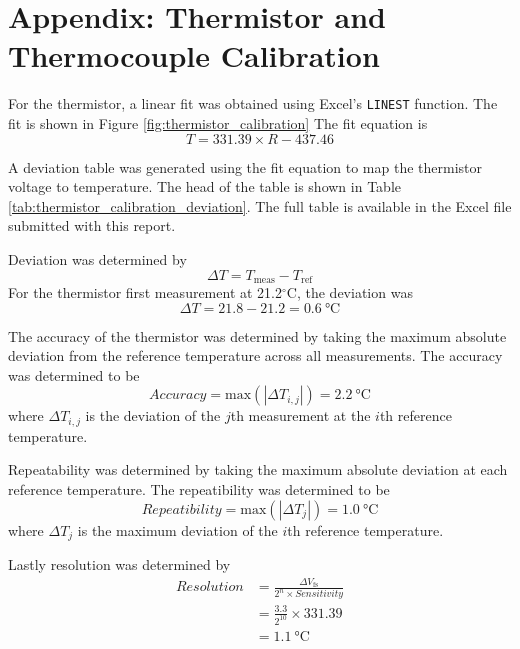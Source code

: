 \section{Appendix: Thermistor and Thermocouple Calibration}

\noindent For the thermistor, a linear fit was obtained using Excel's \texttt{LINEST} function. The fit is shown in Figure \ref{fig:thermistor_calibration}
The fit equation is 
\begin{equation}
    T = 331.39 \times R  -437.46 \label{eq:thermistor_calibration}
\end{equation}

A deviation table was generated using the fit equation to map the thermistor voltage to temperature. The head of the table is shown in 
Table \ref{tab:thermistor_calibration_deviation}. The full table is available in the Excel file submitted with this report.

Deviation was determined by 
\begin{equation}
    \Delta T  = T_{\text{meas}} - T_{\text{ref}} \nonumber
\end{equation}
For the thermistor first measurement at 21.2$^\circ$C, the deviation was
\begin{equation}
    \Delta T = 21.8 - 21.2 = \qty{0.6}{\celsius} \nonumber
\end{equation}


The accuracy of the thermistor was determined by taking the maximum absolute deviation from the reference temperature across all measurements. The 
accuracy was determined to be
\begin{equation}
    Accuracy = \text{max}(|\Delta T_{i, j}|) = \qty{2.2}{\celsius} \nonumber
\end{equation}
where $\Delta T_{i, j}$ is the deviation of the $j$th measurement at the $i$th reference temperature.

Repeatability was determined by taking the maximum absolute deviation at each reference temperature. The repeatibility was determined to be
\begin{equation}
    Repeatibility = \text{max}(|\Delta T_{j}|) = \qty{1.0}{\celsius} \nonumber
\end{equation}
where $\Delta T_{j}$ is the maximum deviation of the $i$th reference temperature.

Lastly resolution was determined by
\begin{align*}
    Resolution &= \frac{\Delta V_{\text{fs}}}{2^n \times Sensitivity} \\
               &= \frac{3.3}{2^{10}} \times 331.39 \\
               &= \qty{1.1}{\celsius}
\end{align*}

